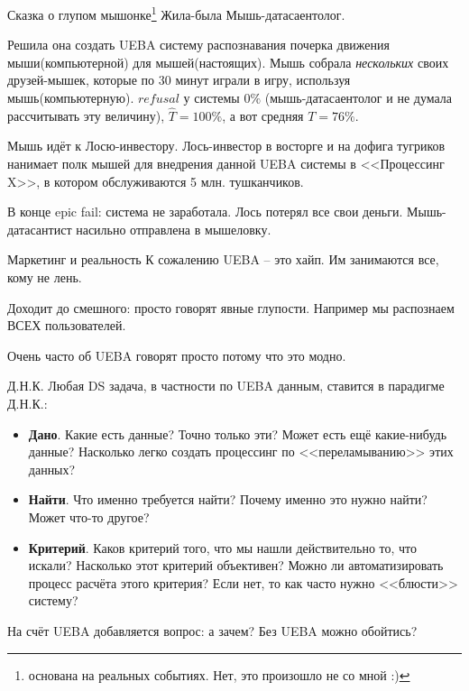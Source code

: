 \begin{frame}{Сказка о глупом мышонке\footnote{основана на реальных событиях. Нет, это произошло не со мной :)}}
	\footnotesize
	Жила-была Мышь-датасаентолог. 
	
	Решила она создать UEBA систему распознавания почерка движения мыши(компьютерной) 
	для мышей(настоящих).  	
	Мышь собрала \textit{нескольких} своих друзей-мышек, 
	которые по 30 минут играли в игру, используя мышь(компьютерную).
	$refusal$ у системы $0\%$ (мышь-датасаентолог и не думала рассчитывать эту величину),
	$\hat T = 100\%$, а вот средняя $T = 76\%$.
	
	Мышь идёт к Лосю-инвестору. Лось-инвестор в восторге
	и на дофига тугриков нанимает полк мышей для внедрения 
	данной UEBA системы
	в <<Процессинг X>>,
	в котором обслуживаются 5 млн. тушканчиков.
	
	В конце epic fail: система не заработала. 
	Лось потерял все свои деньги. Мышь-датасантист насильно отправлена в мышеловку.
	
\end{frame}

\begin{frame}{Маркетинг и реальность}
	К сожалению UEBA -- это хайп. 
	Им занимаются все, кому не лень. 
	
	Доходит до смешного: просто говорят явные глупости.
	Например мы распознаем ВСЕХ пользователей.
	
	Очень часто об UEBA говорят просто потому что это модно.
	
\end{frame}

\begin{frame}{Д.Н.К.}
	Любая DS задача, в частности по UEBA данным, ставится в парадигме Д.Н.К.:
	\begin{itemize}
		\item \textbf{Дано}. Какие есть данные?
		Точно только эти? Может есть ещё какие-нибудь данные?
		Насколько легко создать процессинг по <<переламыванию>>
		этих данных?
		\item \textbf{Найти}. Что именно требуется найти?
		Почему именно это нужно найти? Может что-то другое?
		\item \textbf{Критерий}. Каков критерий того, что мы нашли действительно
		то, что искали? Насколько этот критерий объективен? Можно ли автоматизировать
		процесс расчёта этого критерия? Если нет, то как часто нужно <<блюсти>>
		систему?
	\end{itemize}
	На счёт UEBA добавляется вопрос: а зачем? Без UEBA можно обойтись?
\end{frame}

